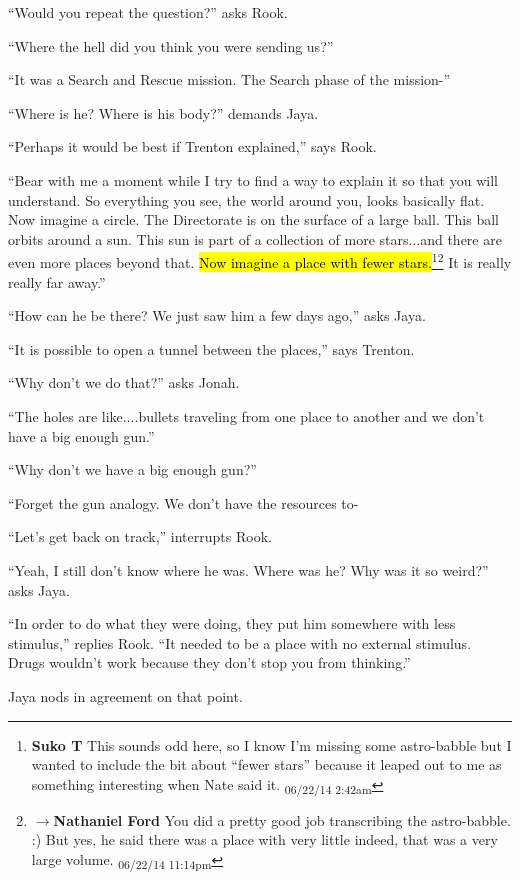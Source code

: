 ``Would you repeat the question?'' asks Rook.

``Where the hell did you think you were sending us?''

``It was a Search and Rescue mission.  The Search phase of the mission-''

``Where is he?  Where is his body?'' demands Jaya.

``Perhaps it would be best if Trenton explained,'' says Rook.

``Bear with me a moment while I try to find a way to explain it so that you will understand.  So everything you see, the world around you, looks basically flat.  Now imagine a circle.  The Directorate is on the surface of a large ball.  This ball orbits around a sun.  This sun is part of a collection of more stars...and there are even more places beyond that.  \hl{Now imagine a place with fewer stars.}\footnote{\textbf{Suko T }This sounds odd here, so I know I'm missing some astro-babble but I wanted to include the bit about ``fewer stars'' because it leaped out to me as something interesting when Nate said it. \textsubscript{06/22/14 2:42am}}\footnote{$\rightarrow$\textbf{Nathaniel Ford }You did a pretty good job transcribing the astro-babble. :) But yes, he said there was a place with very little indeed, that was a very large volume. \textsubscript{06/22/14 11:14pm}}  It is really really far away.''

``How can he be there?  We just saw him a few days ago,'' asks Jaya.

``It is possible to open a tunnel between the places,'' says Trenton.

``Why don't we do that?'' asks Jonah.

``The holes are like....bullets traveling from one place to another and we don't have a big enough gun.''

``Why don't we have a big enough gun?''

``Forget the gun analogy.  We don't have the resources to-

``Let's get back on track,'' interrupts Rook.

``Yeah, I still don't know where he was. Where was he?  Why was it so weird?'' asks Jaya.

``In order to do what they were doing, they put him somewhere with less stimulus,'' replies Rook.  ``It needed to be a place with no external stimulus.  Drugs wouldn't work because they don't stop you from thinking.''

Jaya nods in agreement on that point.

